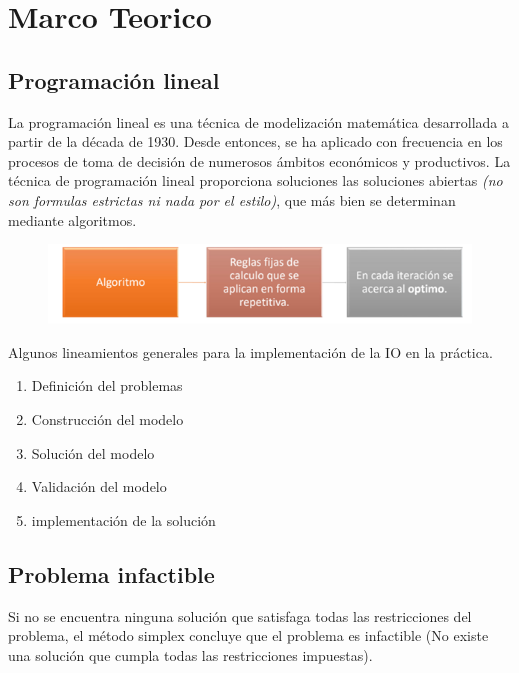 \documentclass[conference]{IEEEtran}
\begin{document}
\section{Marco Teorico}

\subsection{Programación lineal}

La programación lineal es una técnica de modelización matemática desarrollada
a partir de la década de 1930. Desde entonces, se ha aplicado con
frecuencia en los procesos de toma de decisión de numerosos ámbitos
económicos y productivos. La técnica de programación lineal proporciona
soluciones las soluciones abiertas \textit{(no son formulas estrictas ni
    nada por el estilo)}, que más bien se determinan mediante algoritmos.

\begin{figure}[H]
    \begin{center}
        \includegraphics[width=\linewidth]{./Images/ProgramacionLineal.png}
        \caption{}
    \end{center}
\end{figure}

Algunos lineamientos generales para la implementación de la IO en la práctica.

\begin{enumerate}
    \item Definición del problemas
    \item Construcción del modelo
    \item Solución del modelo
    \item Validación del modelo
    \item implementación de la solución
\end{enumerate}

\subsection{Problema infactible}

Si no se encuentra ninguna solución que satisfaga todas las
restricciones del problema, el método simplex concluye que el problema
es infactible (No existe una solución que cumpla todas las
restricciones impuestas).
\end{document}
